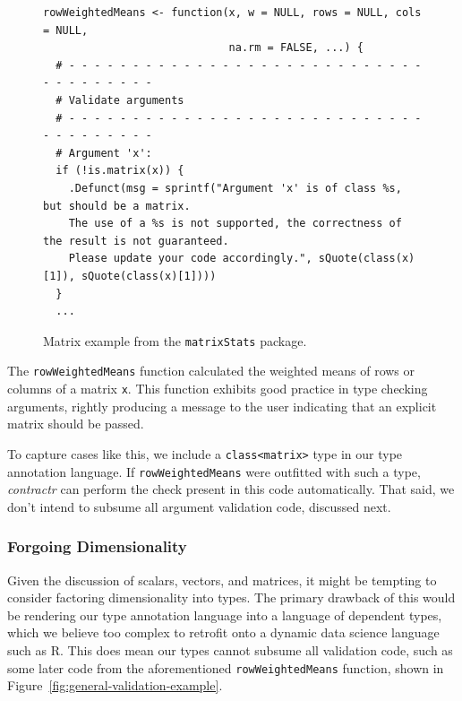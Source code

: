 \documentclass[acmsmall,review,anonymous]{acmart}\settopmatter{printfolios=true,printccs=false,printacmref=false}
\newcommand{\code}[1]{{\lstinline[style=Rin]!#1!}\xspace}
\newcommand{\contractr}{\emph{contractr}\xspace} %
\begin{document}
\begin{figure}[htbp]
\begin{center}

\begin{lstlisting}
rowWeightedMeans <- function(x, w = NULL, rows = NULL, cols = NULL,
                             na.rm = FALSE, ...) {
  # - - - - - - - - - - - - - - - - - - - - - - - - - - - - - - - - - - - - -
  # Validate arguments
  # - - - - - - - - - - - - - - - - - - - - - - - - - - - - - - - - - - - - -
  # Argument 'x':
  if (!is.matrix(x)) {
    .Defunct(msg = sprintf("Argument 'x' is of class %s, but should be a matrix. 
    The use of a %s is not supported, the correctness of the result is not guaranteed. 
    Please update your code accordingly.", sQuote(class(x)[1]), sQuote(class(x)[1])))
  }
  ...
\end{lstlisting}

\caption{Matrix example from the \code{matrixStats} package.}
\label{fig:matrix-example}
\end{center}
\end{figure}

The \code{rowWeightedMeans} function calculated the weighted means of rows or columns of a matrix \code{x}.
This function exhibits good practice in type checking arguments, rightly producing a message to the user indicating that an explicit matrix should be passed.

To capture cases like this, we include a \code{class<matrix>} type in our type annotation language.
If \code{rowWeightedMeans} were outfitted with such a type, \contractr can perform the check present in this code automatically.
That said, we don't intend to subsume all argument validation code, discussed next.
 
%
%
\subsubsection{Forgoing Dimensionality} 

Given the discussion of scalars, vectors, and matrices, it might be tempting to consider factoring dimensionality into types.
The primary drawback of this would be rendering our type annotation language into a language of dependent types, which we believe too complex to retrofit onto a dynamic data science language such as R.  
This does mean our types cannot subsume all validation code, such as some later code from the aforementioned \code{rowWeightedMeans} function, shown in Figure~\ref{fig:general-validation-example}.
\end{document}
